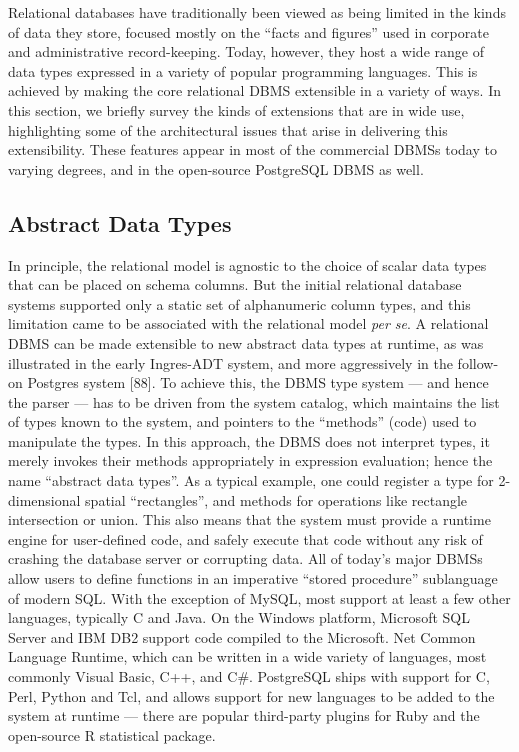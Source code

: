 \documentclass[b5paper,11pt,twoside,openright]{book}
\begin{document}
Relational databases have traditionally been viewed as being limited in
the kinds of data they store, focused mostly on the ``facts and
figures'' used in corporate and administrative record-keeping. Today,
however, they host a wide range of data types expressed in a variety of
popular programming languages. This is achieved by making the core
relational DBMS extensible in a variety of ways. In this section, we
briefly survey the kinds of extensions that are in wide use,
highlighting some of the architectural issues that arise in delivering
this extensibility. These features appear in most of the commercial
DBMSs today to varying degrees, and in the open-source PostgreSQL DBMS
as well.

\hypertarget{abstract-data-types}{%
\subsection{Abstract Data Types}\label{abstract-data-types}}

In principle, the relational model is agnostic to the choice of scalar
data types that can be placed on schema columns. But the initial
relational database systems supported only a static set of alphanumeric
column types, and this limitation came to be associated with the
relational model \emph{per se}. A relational DBMS can be made extensible
to new abstract data types at runtime, as was illustrated in the early
Ingres-ADT system, and more aggressively in the follow-on Postgres
system {[}88{]}.
  To achieve this, the DBMS type system --- and hence the parser --- has
  to be driven from the system catalog, which maintains the list of
  types known to the system, and pointers to the ``methods'' (code) used
  to manipulate the types. In this approach, the DBMS does not interpret
  types, it merely invokes their methods appropriately in expression
  evaluation; hence the name ``abstract data types''. As a typical
  example, one could register a type for 2-dimensional spatial
  ``rectangles'', and methods for operations like rectangle intersection
  or union. This also means that the system must provide a runtime
  engine for user-defined code, and safely execute that code without any
  risk of crashing the database server or corrupting data. All of
  today's major DBMSs allow users to define functions in an imperative
  ``stored procedure'' sublanguage of modern SQL. With the exception of
  MySQL, most support at least a few other languages, typically C and
  Java. On the Windows platform, Microsoft SQL Server and IBM DB2
  support code compiled to the Microsoft. Net Common Language Runtime,
  which can be written in a wide variety of languages, most commonly
  Visual Basic, C++, and C\#. PostgreSQL ships with support for C, Perl,
  Python and Tcl, and allows support for new languages to be added to
  the system at runtime --- there are popular third-party plugins for
  Ruby and the open-source R statistical package.
\end{document}
